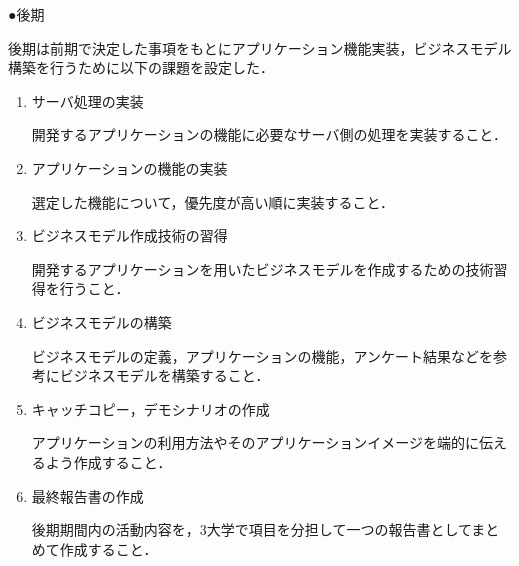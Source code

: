 \par ●後期
\par 後期は前期で決定した事項をもとにアプリケーション機能実装，ビジネスモデル構築を行うために以下の課題を設定した．
\begin{enumerate}
\item サーバ処理の実装
\par 開発するアプリケーションの機能に必要なサーバ側の処理を実装すること．
\item アプリケーションの機能の実装
\par 選定した機能について，優先度が高い順に実装すること．
\item ビジネスモデル作成技術の習得
\par 開発するアプリケーションを用いたビジネスモデルを作成するための技術習得を行うこと．
\item ビジネスモデルの構築
\par ビジネスモデルの定義，アプリケーションの機能，アンケート結果などを参考にビジネスモデルを構築すること．
\item キャッチコピー，デモシナリオの作成
\par アプリケーションの利用方法やそのアプリケーションイメージを端的に伝えるよう作成すること．
\item 最終報告書の作成
\par 後期期間内の活動内容を，3大学で項目を分担して一つの報告書としてまとめて作成すること．
\end{enumerate}
